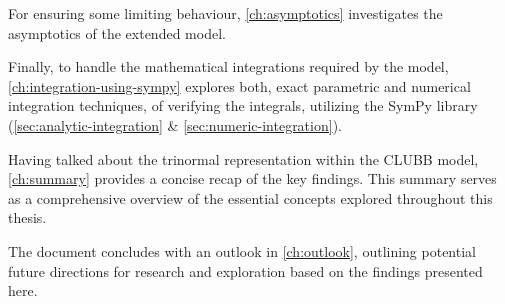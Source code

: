 For ensuring some limiting behaviour,
\cref{ch:asymptotics} investigates the asymptotics of the extended model.

Finally, to handle the mathematical integrations required by the model,
\cref{ch:integration-using-sympy} explores both,
exact parametric and numerical integration techniques,
of verifying the integrals,
utilizing the SymPy library (\cref{sec:analytic-integration} \& \cref{sec:numeric-integration}).

Having talked about the trinormal representation within the \gls{CLUBB} model,
\cref{ch:summary} provides a concise recap of the key findings.
This summary serves as a comprehensive overview of the essential concepts
explored throughout this thesis.

The document concludes with an outlook in \cref{ch:outlook},
outlining potential future directions for research
and exploration based on the findings presented here.
